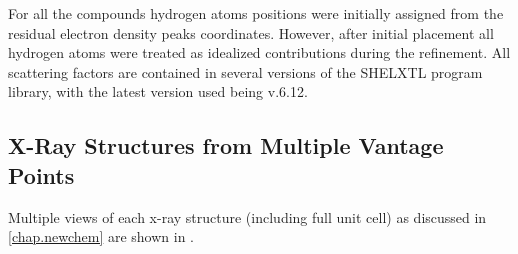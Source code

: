 For all the compounds hydrogen atoms positions were initially assigned from the residual electron density peaks coordinates. However, after initial placement all hydrogen atoms were treated as idealized contributions during the refinement. All scattering factors are contained in several versions of the SHELXTL program library, with the latest version used being v.6.12\autocite{sheldrick2008}.

\subsection{X-Ray Structures from Multiple Vantage Points}\label{ssec.views}
Multiple views of each x-ray structure (including full unit cell) as discussed in \autoref{chap.newchem} are shown in . 

